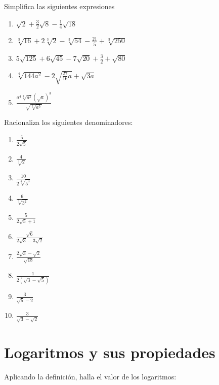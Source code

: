 \Exercicio Simplifica las siguientes expresiones

\begin{enumerate}[topsep=0pt]

	\item $\sqrt{2} + \frac{3}{2} \sqrt{8} - \frac{1}{4}\sqrt{18} $
	\item $\sqrt[3]{16} + 2 \sqrt[3]{2} - \sqrt[3]{54} - \frac{21}{5} + \sqrt[3]{250}$
	\item $5 \sqrt{125} + 6\sqrt{45} - 7\sqrt{20} + \frac{3}{2} + \sqrt{80} $
	\item $\sqrt[4]{144 a^2} - 2 \sqrt{\frac{27}{16} a} + \sqrt{3a} $

	\item $\frac{a^4 \sqrt[3]{a^2}(\sqrt{a})^3}{\sqrt{\sqrt[3]{a^5}}} $

\end{enumerate}



\Exercicio Racionaliza los siguientes denominadores:

\begin{enumerate}[topsep=0pt]

	\item $ \frac{5}{2\sqrt{5}} $

	\item $ \frac{4}{\sqrt[3]{2}} $

	\item $ \frac{10}{2\sqrt[4]{5^3}} $
	\item $ \frac{6}{\sqrt[5]{3^2}} $
	\item $ \frac{5}{2\sqrt{5} + 1} $

	\item $ \frac{\sqrt{6}}{2\sqrt{3} - 3\sqrt{2}} $

	\item $ \frac{2\sqrt{3}-\sqrt{2}}{\sqrt{18}}$
	\item $ \frac{1}{2(\sqrt{3}-\sqrt{5})}$
	\item $ \frac{3}{\sqrt{5}-2}$
	\item $ \frac{3}{\sqrt{3}-\sqrt{2}}$
\end{enumerate}


\section{Logaritmos y sus propiedades}

\Exercicio Aplicando la definición, halla el valor de los logaritmos:

